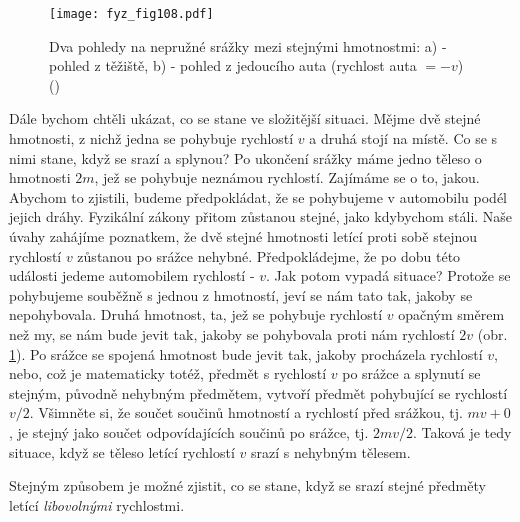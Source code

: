     \begin{figure}[ht!]  %
      \centering
      \texttt{[image: fyz\_fig108.pdf]}
      \caption{Dva pohledy na nepružné srážky mezi stejnými hmotnostmi: a) - pohled z těžiště, b) 
               -  pohled z jedoucího auta (rychlost auta \(= -v\))
              (\cite[s.~145]{Feynman01})}
      \label{fyz:fig108}
    \end{figure}
    Dále bychom chtěli ukázat, co se stane ve složitější situaci. Mějme dvě stejné hmotnosti, z 
    nichž jedna se pohybuje rychlostí \(v\) a druhá stojí na místě. Co se s nimi stane, když se 
    srazí a splynou? Po ukončení srážky máme jedno těleso o hmotnosti \(2m\), jež se pohybuje 
    neznámou rychlostí. Zajímáme se o to, jakou. Abychom to zjistili, budeme předpokládat, že se 
    pohybujeme v automobilu podél jejich dráhy. Fyzikální zákony přitom zůstanou stejné, jako 
    kdybychom stáli. Naše úvahy zahájíme poznatkem, že dvě stejné hmotnosti letící proti sobě 
    stejnou rychlostí \(v\) zůstanou po srážce nehybné. Předpokládejme, že po dobu této události 
    jedeme automobilem rychlostí - \(v\). Jak potom vypadá situace? Protože se pohybujeme souběžně 
    s jednou z hmotností, jeví se nám tato tak, jakoby se nepohybovala. Druhá hmotnost, ta, jež se 
    pohybuje rychlostí \(v\) opačným směrem než my, se nám bude jevit tak, jakoby se pohybovala 
    proti nám rychlostí \(2v\) (obr. \ref{fyz:fig108}). Po srážce se spojená hmotnost bude jevit 
    tak, jakoby procházela rychlostí \(v\), nebo, což je matematicky totéž, předmět s rychlostí 
    \(v\) po srážce a splynutí se stejným, původně nehybným předmětem, vytvoří předmět pohybující 
    se rychlostí \(v/2\). Všimněte si, že součet součinů hmotností a rychlostí před srážkou, tj. 
    \(mv + 0\), je stejný jako součet odpovídajících součinů po srážce, tj. \(2mv/2\). Taková je 
    tedy situace, když se těleso letící rychlostí \(v\) srazí s nehybným tělesem.

    Stejným způsobem je možné zjistit, co se stane, když se srazí stejné předměty letící 
    \emph{libovolnými} rychlostmi.

